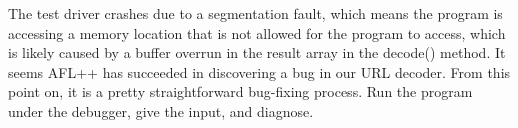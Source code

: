 
The test driver crashes due to a segmentation fault, which means the program is accessing a memory location that is not allowed for the program to access, which is likely caused by a buffer overrun in the result array in the decode() method. It seems AFL++ has succeeded in discovering a bug in our URL decoder. From this point on, it is a pretty straightforward bug-fixing process. Run the program under the debugger, give the input, and diagnose.








